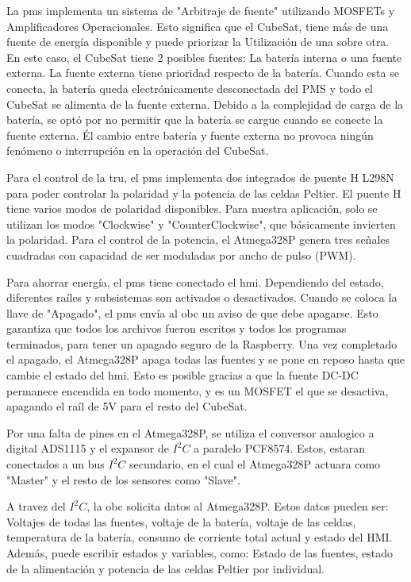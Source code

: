       La \acrshort{pms} implementa un sistema de "Arbitraje de fuente" utilizando MOSFETs y Amplificadores
      Operacionales. Esto significa que el CubeSat, tiene más de una fuente de energía disponible y puede priorizar la
      Utilización de una sobre otra. En este caso, el CubeSat tiene 2 posibles fuentes: La batería interna o una fuente
      externa. La fuente externa tiene prioridad respecto de la batería. Cuando esta se conecta, la batería queda
      electrónicamente desconectada del PMS y todo el CubeSat se alimenta de la fuente externa. Debido a la complejidad
      de carga de la batería, se optó por no permitir que la batería se cargue cuando se conecte la fuente externa. Él
      cambio entre batería y fuente externa no provoca ningún fenómeno o interrupción en la operación del CubeSat.

      Para el control de la \acrshort{tru}, el \acrshort{pms} implementa dos integrados de puente H L298N para poder
      controlar la polaridad y la potencia de las celdas Peltier. El puente H tiene varios modos de polaridad
      disponibles. Para nuestra aplicación, solo se utilizan los modos "Clockwise" y "CounterClockwise", que básicamente
      invierten la polaridad. Para el control de la potencia, el Atmega328P genera tres señales cuadradas con capacidad
      de ser moduladas por ancho de pulso (PWM).

      Para ahorrar energía, el \acrshort{pms} tiene conectado el \acrshort{hmi}. Dependiendo del estado, diferentes
      raíles y subsistemas son activados o desactivados. Cuando se coloca la llave de "Apagado", el \acrshort{pms} envía
      al \acrshort{obc} un aviso de que debe apagarse. Esto garantiza que todos los archivos fueron escritos y todos los
      programas terminados, para tener un apagado seguro de la Raspberry. Una vez completado el apagado, el Atmega328P
      apaga todas las fuentes y se pone en reposo hasta que cambie el estado del \acrshort{hmi}. Esto es posible gracias
      a que la fuente DC-DC permanece encendida en todo momento, y es un MOSFET el que se desactiva, apagando el raíl de
      5V para el resto del CubeSat.

      Por una falta de pines en el Atmega328P, se utiliza el conversor analogico a digital ADS1115 y el expansor de
      $I^2C$ a paralelo PCF8574. Estos, estaran conectados a un bus $I^2C$ secundario, en el cual el Atmega328P actuara
      como "Master" y el resto de los sensores como "Slave".

      A travez del $I^2C$, la \acrshort{obc} solicita datos al Atmega328P. Estos datos pueden ser: Voltajes de todas las
      fuentes, voltaje de la batería, voltaje de las celdas, temperatura de la batería, consumo de corriente total
      actual y estado del HMI. Además, puede escribir estados y variables, como: Estado de las fuentes, estado de la 
      alimentación y potencia de las celdas Peltier por individual.

